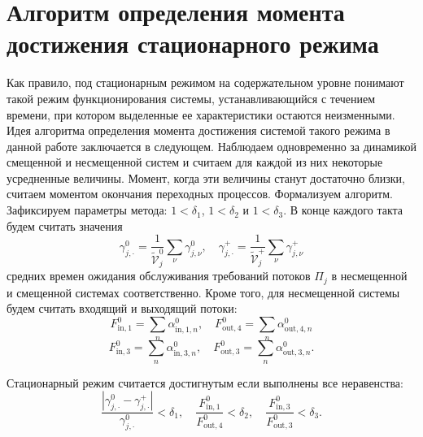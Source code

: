 \documentclass[a4paper,12pt,russian]{extarticle}
\begin{document}
\section{Алгоритм определения момента достижения стационарного режима}
Как правило, под стационарным режимом на содержательном уровне понимают такой режим функционирования системы, устанавливающийся с течением времени, при котором выделенные ее характеристики остаются неизменными. Идея алгоритма определения момента достижения системой такого режима в данной работе заключается в следующем. Наблюдаем одновременно за динамикой смещенной и несмещенной систем и считаем для каждой из них некоторые усредненные величины. Момент, когда эти величины станут достаточно близки, считаем моментом окончания переходных процессов. Формализуем алгоритм. Зафиксируем параметры метода:  $1 < \delta_1$, $1 < \delta_2$ и $1 < \delta_3$. В конце каждого такта будем считать значения 
\begin{equation}
   \gamma_{j,\cdot}^0 = \frac{1}{\tilde{\mathcal{V}}_j^0}\sum_{\nu} \gamma_{j,\nu}^0, \quad \gamma_{j,\cdot}^+ = \frac{1}{\tilde{\mathcal{V}}_j^+}\sum_{\nu} \gamma_{j,\nu}^+ 
\end{equation}
средних времен ожидания обслуживания требований потоков $\Pi_j$ в несмещенной и смещенной системах соответственно. Кроме того, для несмещенной системы будем считать входящий и выходящий потоки:
\begin{equation}
    F^{0}_{\text{in},1} = \sum_n \alpha^{0}_{\text{in},1,n}, \quad 
    F^{0}_{\text{out},4} = \sum_n \alpha^{0}_{\text{out},4,n}
\end{equation}
\begin{equation}
    F^{0}_{\text{in},3} = \sum_n \alpha^{0}_{\text{in},3,n}, \quad 
    F^{0}_{\text{out},3} = \sum_n \alpha^{0}_{\text{out},3,n}.
\end{equation}


Стационарный режим считается достигнутым если выполнены все неравенства:
\begin{equation}
    \frac{|\gamma_{j,\cdot}^0 - \gamma_{j,\cdot}^+|}{\gamma_{j,\cdot}^0} < \delta_1, \quad
    \frac{F^{0}_{\text{in},1}}{F^{0}_{\text{out},4}} < \delta_2, \quad 
    \frac{F^{0}_{\text{in},3}}{F^{0}_{\text{out},3}} < \delta_3.
\end{equation}
\end{document}
